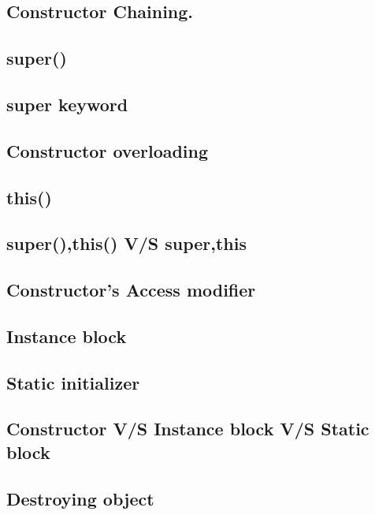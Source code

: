 \documentclass[14pt,fleqn]{extbook} %
\begin{document}
\subsection{Constructor Chaining.}

\subsection{super()}

\subsection{super keyword}

\subsection{Constructor overloading}

\subsection{this()}

\subsection{super(),this() V/S super,this}

\subsection{Constructor's Access modifier}

\subsection{Instance block}

\subsection{Static initializer}

\subsection{Constructor V/S Instance block V/S Static block}

\subsection{Destroying object}

%
\end{document}
